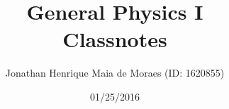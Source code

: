 \title{General Physics I \\ Classnotes}
\author{Jonathan Henrique Maia de Moraes (ID: 1620855)}
\date{01/25/2016}
\maketitle
